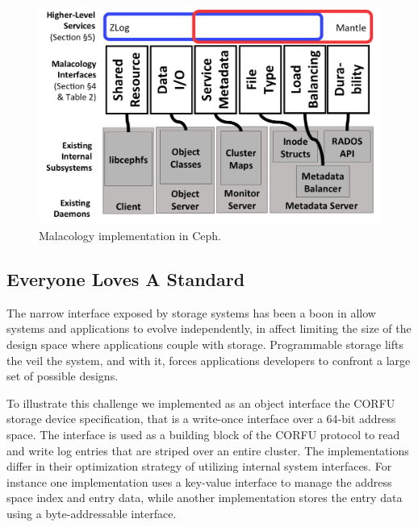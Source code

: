 \begin{figure}[th]
\centering
\includegraphics[width=1.0\linewidth]{implementation-overview.png}
\caption{Malacology implementation in Ceph.}
\label{fig:malacology}
\end{figure}

\subsection{Everyone Loves A Standard}

The narrow interface exposed by storage systems has been a boon in allow
systems and applications to evolve independently, in affect limiting the size
of the design space where applications couple with storage. Programmable
storage lifts the veil the system, and with it, forces applications developers
to confront a large set of possible designs.

To illustrate this challenge we implemented as an object interface the CORFU
storage device specification, that is a write-once interface over a 64-bit
address space. The interface is used as a building block of the CORFU protocol
to read and write log entries that are striped over an entire cluster. 
The implementations differ in their optimization strategy of utilizing
internal system interfaces. For instance one implementation uses a key-value
interface to manage the address space index and entry data, while another
implementation stores the entry data using a byte-addressable interface.

